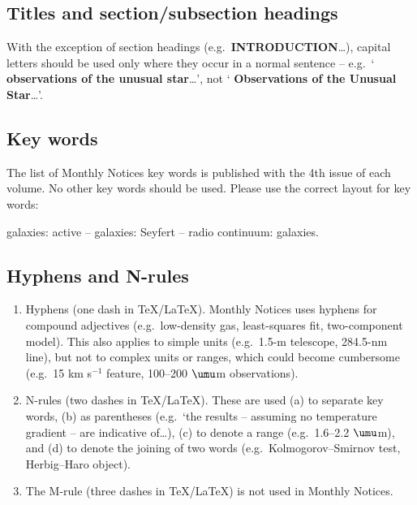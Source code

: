\subsection{Titles and section/subsection headings}

With the exception of section headings (e.g.\
{\bf INTRO\-DUC\-TION}\ldots),
capital letters should be used only where they occur in a normal
sentence -- e.g.\ 
` {\bf observations of the unusual star}\ldots', not
`\textbfit{ROSAT\/} {\bf Observations of the Unusual Star}\ldots'.

\subsection{Key words}

The  list of Monthly Notices key words is published with the  4th 
issue  of each volume. No other key words should be used.  Please 
use the correct layout for key words: 
\smallskip        

 galaxies: active -- galaxies: Seyfert -- 
radio continuum: galaxies.
        
\subsection{Hyphens and N-rules}

\begin{enumerate}
\item Hyphens (one dash in \TeX/\LaTeX). Monthly Notices uses hyphens 
for compound adjectives (e.g.\ low-density gas, least-squares fit, 
two-component  model).  This also applies to simple  units  (e.g.\ 
1.5-m  telescope,  284.5-nm line), but not to  complex  units  or 
ranges,  which could become cumbersome (e.g.\ 15 km  s$^{-1}$  feature, 
100--200 $\umu$m observations).

\item N-rules (two dashes in \TeX/\LaTeX). These are used  (a)  to 
separate  key  words, (b) as parentheses (e.g.\  `the  results  -- 
assuming no temperature gradient -- are indicative of\ldots), (c) to 
denote a range (e.g.\ 1.6--2.2 $\umu$m), and (d) to denote the  joining 
of   two  words  (e.g.\  Kolmogorov--Smirnov  test,   Herbig--Haro 
object).
        
\item The  M-rule (three dashes in \TeX/\LaTeX) is  not  used  in 
Monthly Notices.
\end{enumerate}

